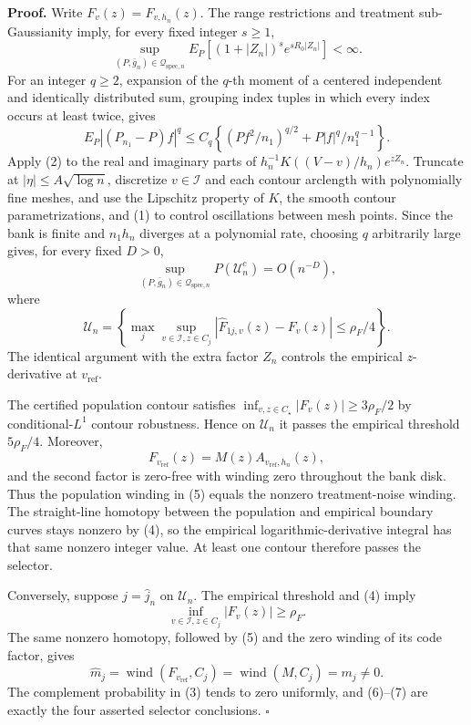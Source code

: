 \textbf{Proof.}
Write \(F_v(z)=F_{v,h_n}(z)\).  The range restrictions and treatment sub-Gaussianity imply, for every fixed integer \(s\ge1\),
\[
 \sup_{(P,\bar g_n)\in\mathcal Q_{\mathrm{spec},n}}
 E_P[(1+|Z_n|)^se^{sR_0|Z_n|}]<\infty. \tag{1}
\]
For an integer \(q\ge2\), expansion of the \(q\)-th moment of a centered independent and identically distributed sum, grouping index tuples in which every index occurs at least twice, gives
\[
 E_P|(P_{n_1}-P)f|^q
 \le C_q\left\{(Pf^2/n_1)^{q/2}+P|f|^q/n_1^{q-1}\right\}. \tag{2}
\]
Apply (2) to the real and imaginary parts of
\(h_n^{-1}K((V-v)/h_n)e^{zZ_n}\).  Truncate at \(|\eta|\le A\sqrt{\log n}\), discretize \(v\in\mathcal I\) and each contour arclength with polynomially fine meshes, and use the Lipschitz property of \(K\), the smooth contour parametrizations, and (1) to control oscillations between mesh points.  Since the bank is finite and \(n_1h_n\) diverges at a polynomial rate, choosing \(q\) arbitrarily large gives, for every fixed \(D>0\),
\[
 \sup_{(P,\bar g_n)\in\mathcal Q_{\mathrm{spec},n}}P(\mathcal U_n^c)=O(n^{-D}), \tag{3}
\]
where
\[
 \mathcal U_n=\left\{
 \max_j\sup_{v\in\mathcal I,z\in C_j}
 |\widehat F_{1j,v}(z)-F_v(z)|\le\rho_F/4
 \right\}. \tag{4}
\]
The identical argument with the extra factor \(Z_n\) controls the empirical \(z\)-derivative at \(v_{\mathrm{ref}}\).

The certified population contour satisfies
\(\inf_{v,z\in C_\star}|F_v(z)|\ge3\rho_F/2\) by conditional-\(L^1\) contour robustness.  Hence on \(\mathcal U_n\) it passes the empirical threshold \(5\rho_F/4\).  Moreover,
\[
 F_{v_{\mathrm{ref}}}(z)=M(z)A_{v_{\mathrm{ref}},h_n}(z), \tag{5}
\]
and the second factor is zero-free with winding zero throughout the bank disk.  Thus the population winding in (5) equals the nonzero treatment-noise winding.  The straight-line homotopy between the population and empirical boundary curves stays nonzero by (4), so the empirical logarithmic-derivative integral has that same nonzero integer value.  At least one contour therefore passes the selector.

Conversely, suppose \(j=\widehat j_n\) on \(\mathcal U_n\).  The empirical threshold and (4) imply
\[
 \inf_{v\in\mathcal I,z\in C_j}|F_v(z)|\ge\rho_F. \tag{6}
\]
The same nonzero homotopy, followed by (5) and the zero winding of its code factor, gives
\[
 \widehat m_j
 =\operatorname{wind}(F_{v_{\mathrm{ref}}},C_j)
 =\operatorname{wind}(M,C_j)=m_j\ne0. \tag{7}
\]
The complement probability in (3) tends to zero uniformly, and (6)--(7) are exactly the four asserted selector conclusions. \(\square\)